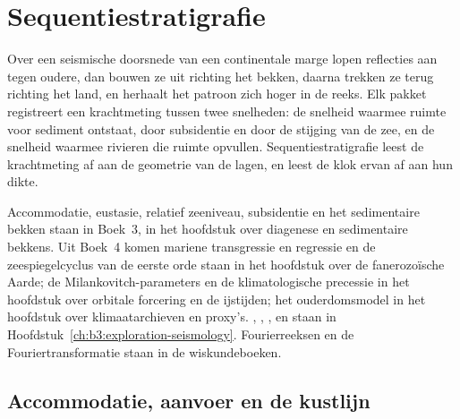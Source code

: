 \chapter{Sequentiestratigrafie}\label{ch:b3:sequence-stratigraphy}

Over een seismische doorsnede van een continentale marge lopen reflecties aan tegen
oudere, dan bouwen ze uit richting het bekken, daarna trekken ze terug richting het land, en
herhaalt het patroon zich hoger in de reeks. Elk pakket registreert een krachtmeting tussen
twee snelheden: de snelheid waarmee ruimte voor sediment ontstaat, door subsidentie en door
de stijging van de zee, en de snelheid waarmee rivieren die ruimte opvullen.
Sequentiestratigrafie leest de krachtmeting af aan de geometrie van de lagen, en
 leest de klok ervan af aan hun dikte.

\begin{recall}
Accommodatie, eustasie, relatief zeeniveau, subsidentie en het sedimentaire
bekken staan in Boek~3, in het hoofdstuk over diagenese en sedimentaire bekkens.
Uit Boek~4 komen mariene transgressie en regressie en de zeespiegelcyclus van de
eerste orde staan in het hoofdstuk over de fanerozoïsche Aarde; de
Milankovitch-parameters en de klimatologische precessie in het hoofdstuk over orbitale
forcering en de ijstijden; het ouderdomsmodel in het hoofdstuk over klimaatarchieven
en proxy's. , , ,  en
 staan in Hoofdstuk~\ref{ch:b3:exploration-seismology}. Fourierreeksen
en de Fouriertransformatie staan in de wiskundeboeken.
\end{recall}

\section{Accommodatie, aanvoer en de kustlijn}\label{sec:b3:sequence-stratigraphy:shoreline}

